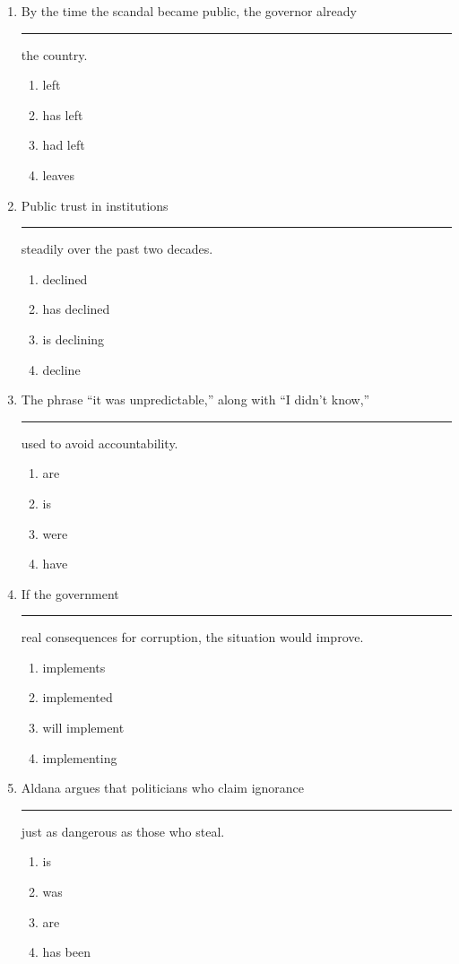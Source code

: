 \documentclass[10pt,a4paper]{article}
\begin{document}
\begin{enumerate}[label=\textbf{\arabic*.}, leftmargin=*]
\item By the time the scandal became public, the governor
already \rule{2cm}{0.4pt} the country.
\begin{enumerate}[label=(\Alph*)]
\item left \item has left \item had left \item leaves
\end{enumerate}

\item Public trust in institutions \rule{2cm}{0.4pt} steadily
over the past two decades.
\begin{enumerate}[label=(\Alph*)]
\item declined \item has declined
\item is declining \item decline
\end{enumerate}

\item The phrase ``it was unpredictable,'' along with
``I didn't know,'' \rule{2cm}{0.4pt} used to avoid accountability.
\begin{enumerate}[label=(\Alph*)]
\item are \item is \item were \item have
\end{enumerate}

\item If the government \rule{2cm}{0.4pt} real consequences
for corruption, the situation would improve.
\begin{enumerate}[label=(\Alph*)]
\item implements \item implemented
\item will implement \item implementing
\end{enumerate}

\item Aldana argues that politicians who claim ignorance
\rule{2cm}{0.4pt} just as dangerous as those who steal.
\begin{enumerate}[label=(\Alph*)]
\item is \item was \item are \item has been
\end{enumerate}

\end{enumerate}
\end{document}
